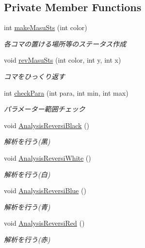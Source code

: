 \subsection*{Private Member Functions}
\begin{DoxyCompactItemize}
\item 
int \hyperlink{class_reversi4color_wpf_1_1_my_reversi_aacb2634fe75f3290910033d13bd335aa}{make\+Masu\+Sts} (int color)
\begin{DoxyCompactList}\small\item\em 各コマの置ける場所等のステータス作成 \end{DoxyCompactList}\item 
void \hyperlink{class_reversi4color_wpf_1_1_my_reversi_a6b5efd6678f80b1a5637576748457b3b}{rev\+Masu\+Sts} (int color, int y, int x)
\begin{DoxyCompactList}\small\item\em コマをひっくり返す \end{DoxyCompactList}\item 
int \hyperlink{class_reversi4color_wpf_1_1_my_reversi_a0b9374fdb5d82d5e59cddeb5f25ef676}{check\+Para} (int para, int min, int max)
\begin{DoxyCompactList}\small\item\em パラメーター範囲チェック \end{DoxyCompactList}\item 
void \hyperlink{class_reversi4color_wpf_1_1_my_reversi_af3e53dce82787cfdad079a37c2c73f61}{Analysis\+Reversi\+Black} ()
\begin{DoxyCompactList}\small\item\em 解析を行う(黒) \end{DoxyCompactList}\item 
void \hyperlink{class_reversi4color_wpf_1_1_my_reversi_a93276b74fb1de8525be31615ff03427e}{Analysis\+Reversi\+White} ()
\begin{DoxyCompactList}\small\item\em 解析を行う(白) \end{DoxyCompactList}\item 
void \hyperlink{class_reversi4color_wpf_1_1_my_reversi_a4acbdc2f3b8873eb4e5e0858eb4cfc75}{Analysis\+Reversi\+Blue} ()
\begin{DoxyCompactList}\small\item\em 解析を行う(青) \end{DoxyCompactList}\item 
void \hyperlink{class_reversi4color_wpf_1_1_my_reversi_afb6eb8a1ecd5bb4498425bea6103f261}{Analysis\+Reversi\+Red} ()
\begin{DoxyCompactList}\small\item\em 解析を行う(赤) \end{DoxyCompactList}\end{DoxyCompactItemize}
